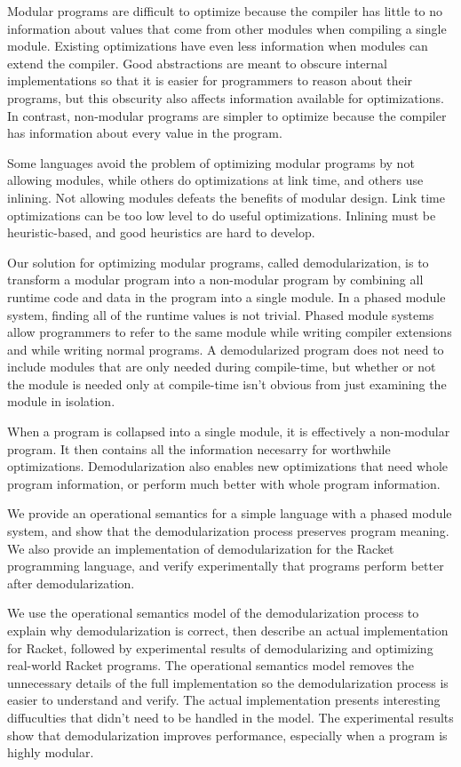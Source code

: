 \documentclass{llncs}
\begin{document}
Modular programs are difficult to optimize because the compiler has little to no information about values that come from other modules when compiling a single module.
Existing optimizations have even less information when modules can extend the compiler. 
Good abstractions are meant to obscure internal implementations so that it is easier for programmers to reason about their programs, but this obscurity also affects information available for optimizations.  
In contrast, non-modular programs are simpler to optimize because the compiler has information about every value in the program.

Some languages avoid the problem of optimizing modular programs by not allowing modules, while others do optimizations at link time, and others use inlining. 
Not allowing modules defeats the benefits of modular design. 
Link time optimizations can be too low level to do useful optimizations. 
Inlining must be heuristic-based, and good heuristics are hard to develop. 

Our solution for optimizing modular programs, called demodularization, is to transform a modular program into a non-modular program by combining all runtime code and data in the program into a single module.
In a phased module system, finding all of the runtime values is not trivial.
Phased module systems allow programmers to refer to the same module while writing compiler extensions and while writing normal programs.
A demodularized program does not need to include modules that are only needed during compile-time, but whether or not the module is needed only at compile-time isn't obvious from just examining the module in isolation. 

When a program is collapsed into a single module, it is effectively a non-modular program. It then contains all the information necesarry for worthwhile optimizations. Demodularization also enables new optimizations that need whole program information, or perform much better with whole program information. 

We provide an operational semantics for a simple language with a phased module system, and show that the demodularization process preserves program meaning. We also provide an implementation of demodularization for the Racket programming language, and verify experimentally that programs perform better after demodularization.

We use the operational semantics model of the demodularization process to explain why demodularization is correct, then describe an actual implementation for Racket, followed by experimental results of demodularizing and optimizing real-world Racket programs. The operational semantics model removes the unnecessary details of the full implementation so the demodularization process is easier to understand and verify. The actual implementation presents interesting diffuculties that didn't need to be handled in the model. The experimental results show that demodularization improves performance, especially when a program is highly modular. 
\end{document}
